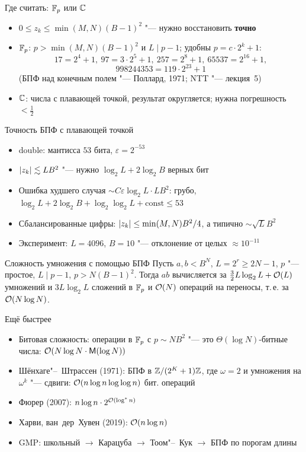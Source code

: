 \documentclass{ca-slides}
\begin{document}
\begin{canvasframe}{Где считать: $\mathbb{F}_{p}$ или $\mathbb{C}$}
  \begin{itemize}
    \item $0 \le z_k \le \min(M, N)(B - 1)^2$ "--- нужно восстановить \textbf{точно}
    \item $\mathbb{F}_{p}$: $p > \min(M, N)(B - 1)^2$ и $L \mid p - 1$; удобны $p = c \cdot 2^k + 1$:
      \[ 17 = 2^4 + 1,\ 97 = 3 \cdot 2^5 + 1,\ 257 = 2^8 + 1,\ 65537 = 2^{16} + 1, \]
      \[ 998244353 = 119 \cdot 2^{23} + 1 \]
      (БПФ над конечным полем "--- Поллард, 1971; NTT "--- лекция~5)
    \item $\mathbb{C}$: числа с плавающей точкой, результат округляется; нужна погрешность
      $< \frac12$
  \end{itemize}
\end{canvasframe}

\begin{canvasframe}{Точность БПФ с плавающей точкой}
  \begin{itemize}
    \item double: мантисса $53$ бита, $\varepsilon = 2^{-53}$
    \item $\lvert z_k\rvert \lesssim L B^2$ "--- нужно $\log_2 L + 2\log_2 B$ верных бит
    \item Ошибка худшего случая $\sim C \varepsilon \log_2 L \cdot L B^2$:
      грубо, $\log_2 L + 2\log_2 B + \log_2\log_2 L + \mathrm{const} \le 53$
    \item Сбалансированные цифры: $\lvert z_k\rvert \le \min(M, N) B^2/4$, а типично $\sim \sqrt L B^2$
    \item Эксперимент: $L = 4096$, $B = 10$ "--- отклонение от целых $\approx 10^{-11}$
  \end{itemize}
  \penspace[0.15\textheight]
\end{canvasframe}

\begin{theoremframe}{Сложность умножения с помощью БПФ}
  Пусть $a, b < B^N$, $L = 2^r \ge 2N - 1$, $p$ "--- простое, $L \mid p - 1$, $p > N(B-1)^2$.
  Тогда $ab$ вычисляется за $\frac32 L \log_2 L + \mathcal{O}(L)$ умножений и $3L\log_2 L$ сложений
  в $\mathbb{F}_{p}$ и $\mathcal{O}(N)$ операций на переносы, т.\,е. за $\mathcal{O}(N \log N)$.
\end{theoremframe}

\begin{canvasframe}{Ещё быстрее}
  \begin{itemize}
    \item Битовая сложность: операции в $\mathbb{F}_{p}$ с $p \sim N B^2$ "--- это $\Theta(\log N)$-битные
      числа: $\mathcal{O}(N \log N \cdot \mathsf M(\log N))$
    \item Шёнхаге"--~Штрассен (1971): БПФ в $\mathbb{Z}/(2^K + 1)\mathbb{Z}$, где $\omega = 2$ и умножения на
      $\omega^k$ "--- сдвиги: $\mathcal{O}(n \log n \log\log n)$ бит. операций
    \item Фюрер (2007): $n \log n \cdot 2^{\mathcal{O}(\log^* n)}$
    \item Харви, ван~дер~Хувен (2019): $\mathcal{O}(n \log n)$
    \item GMP: школьный $\to$ Карацуба $\to$ Тоом"--~Кук $\to$ БПФ по порогам длины
  \end{itemize}
\end{canvasframe}
\end{document}
